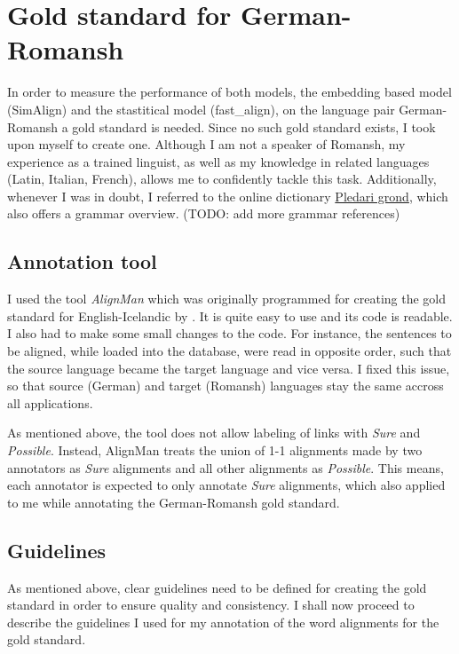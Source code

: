 \section{Gold standard for German-Romansh}
In order to measure the performance of both models, the embedding based model (SimAlign) and the stastitical model (fast\_align), on the language pair German-Romansh a gold standard is needed. 
Since no such gold standard exists, I took upon myself to create one. 
Although I am not a speaker of Romansh, my experience as a trained linguist, as well as my knowledge in related languages (Latin, Italian, French), allows me to confidently tackle this task. 
Additionally, whenever I was in doubt, I referred to the online dictionary \href{https://www.pledarigrond.ch/rumantschgrischun}{Pledari grond}, which also offers a grammar overview. 
(TODO: add more grammar references)

\subsection{Annotation tool}
\label{sec:AlignMan}
I used the tool \emph{AlignMan} which was originally programmed for creating the gold standard for English-Icelandic by \cite{steingrimsson-etal-2021-combalign}. 
It is quite easy to use and its code is readable. 
I also had to make some small changes to the code. 
For instance, the sentences to be aligned, while loaded into the database, were read in opposite order, such that the source language became the target language and vice versa. 
I fixed this issue, so that source (German) and target (Romansh) languages stay the same accross all applications.

As mentioned above, the tool does not allow labeling of links with \emph{Sure} and \emph{Possible}. 
Instead, AlignMan treats the union of 1-1 alignments made by two annotators as \emph{Sure} alignments and all other alignments as \emph{Possible}. 
This means, each annotator is expected to only annotate \emph{Sure} alignments, which also applied to me while annotating the German-Romansh gold standard. 


\subsection{Guidelines}
As mentioned above, clear guidelines need to be defined for creating the gold standard in order to ensure quality and consistency. I shall now proceed to describe the guidelines I used for my annotation of the word alignments for the gold standard.

